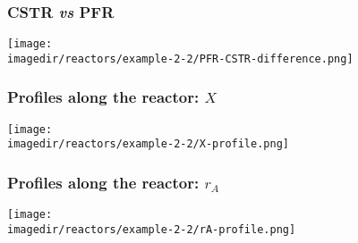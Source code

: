 \begin{frame}\frametitle{CSTR \emph{vs} PFR}
	\begin{center}
		\texttt{[image: \\imagedir/reactors/example-2-2/PFR-CSTR-difference.png]}
	\end{center}
\end{frame}

\begin{frame}\frametitle{Profiles along the reactor: $X$}
	\begin{center}
		\texttt{[image: \\imagedir/reactors/example-2-2/X-profile.png]}
	\end{center}
\end{frame}

\begin{frame}\frametitle{Profiles along the reactor: $r_A$}
	\begin{center}
		\texttt{[image: \\imagedir/reactors/example-2-2/rA-profile.png]}
	\end{center}
\end{frame}

